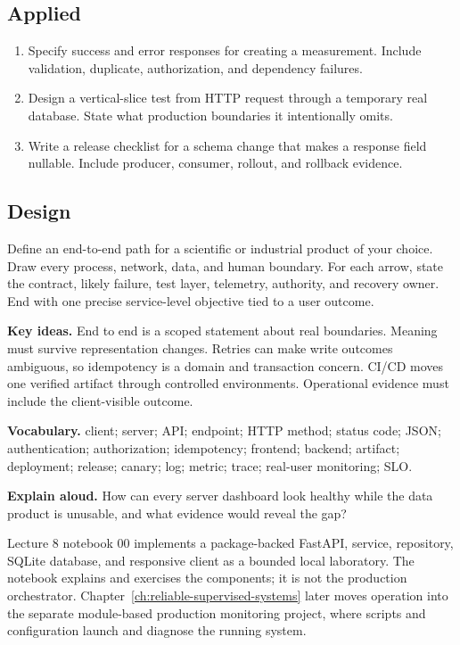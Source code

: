 \subsection*{Applied}
\begin{enumerate}
  \item Specify success and error responses for creating a measurement. Include
  validation, duplicate, authorization, and dependency failures.
  \item Design a vertical-slice test from HTTP request through a temporary real
  database. State what production boundaries it intentionally omits.
  \item Write a release checklist for a schema change that makes a response
  field nullable. Include producer, consumer, rollout, and rollback evidence.
\end{enumerate}

\subsection*{Design}
Define an end-to-end path for a scientific or industrial product of your
choice. Draw every process, network, data, and human boundary. For each arrow,
state the contract, likely failure, test layer, telemetry, authority, and
recovery owner. End with one precise service-level objective tied to a user
outcome.

\begin{chapterreview}
\textbf{Key ideas.} End to end is a scoped statement about real boundaries.
Meaning must survive representation changes. Retries can make write outcomes
ambiguous, so idempotency is a domain and transaction concern. CI/CD moves one
verified artifact through controlled environments. Operational evidence must
include the client-visible outcome.

\textbf{Vocabulary.} client; server; API; endpoint; HTTP method; status code;
JSON; authentication; authorization; idempotency; frontend; backend; artifact;
deployment; release; canary; log; metric; trace; real-user monitoring; SLO.

\textbf{Explain aloud.} How can every server dashboard look healthy while the
data product is unusable, and what evidence would reveal the gap?
\end{chapterreview}

\begin{notebooklink}
Lecture 8 notebook 00 implements a package-backed FastAPI, service, repository,
SQLite database, and responsive client as a bounded local laboratory. The
notebook explains and exercises the components; it is not the production
orchestrator. Chapter~\ref{ch:reliable-supervised-systems} later moves operation
into the separate module-based production monitoring project, where scripts and
configuration launch and diagnose the running system.
\end{notebooklink}

